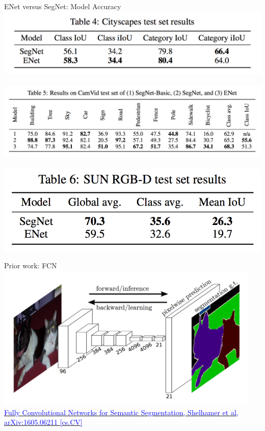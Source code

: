 \documentclass[]{beamer}
\begin{document}
\begin{frame}{ENet versus SegNet: Model Accuracy}
\centering
\includegraphics[scale=0.325]{figures/enet-versus-segnet-accuracy-1-cityscapes} \\
\hspace*{\fill} \\
\includegraphics[scale=0.325]{figures/enet-versus-segnet-accuracy-2-camvid} \\
\hspace*{\fill} \\
\includegraphics[scale=0.325]{figures/enet-versus-segnet-accuracy-3-sun-rgbd} \\
\end{frame}

\begin{frame}{Prior work: FCN}
\centering
\includegraphics[width=0.95\textwidth]{figures/fcn-1} \\
\href{https://arxiv.org/abs/1605.06211}{\textcolor{blue}{Fully Convolutional Networks for Semantic Segmentation, Shelhamer et al, arXiv:1605.06211 [cs.CV]}}
\end{frame}
\end{document}
